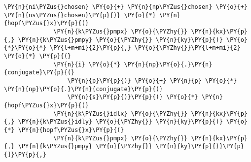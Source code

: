 \begin{Verbatim}[commandchars=\\\{\}]
              \PY{n}{ni\PYZus{}chosen} \PY{o}{+} \PY{n}{np\PYZus{}chosen} \PY{o}{+} \PY{n}{ns\PYZus{}chosen}\PY{p}{)} \PY{o}{*} \PY{n}{hopf\PYZus{}x}\PY{p}{(}
              \PY{n}{k\PYZus{}pmpx} \PY{o}{\PYZhy{}} \PY{n}{kx}\PY{p}{,} \PY{n}{k\PYZus{}pmpy} \PY{o}{\PYZhy{}} \PY{n}{ky}\PY{p}{)} \PY{o}{*}\PY{o}{*} \PY{l+m+mi}{2}\PY{p}{,} \PY{o}{\PYZhy{}}\PY{l+m+mi}{2} \PY{o}{*} \PY{p}{(}
              \PY{n}{i} \PY{o}{*} \PY{n}{np}\PY{o}{.}\PY{n}{conjugate}\PY{p}{(}
                  \PY{n}{p}\PY{p}{)} \PY{o}{+} \PY{n}{p} \PY{o}{*} \PY{n}{np}\PY{o}{.}\PY{n}{conjugate}\PY{p}{(}
                  \PY{n}{s}\PY{p}{)}\PY{p}{)} \PY{o}{*} \PY{n}{hopf\PYZus{}x}\PY{p}{(}
              \PY{n}{k\PYZus{}idlx} \PY{o}{\PYZhy{}} \PY{n}{kx}\PY{p}{,} \PY{n}{k\PYZus{}idly} \PY{o}{\PYZhy{}} \PY{n}{ky}\PY{p}{)} \PY{o}{*} \PY{n}{hopf\PYZus{}x}\PY{p}{(}
              \PY{n}{k\PYZus{}pmpx} \PY{o}{\PYZhy{}} \PY{n}{kx}\PY{p}{,} \PY{n}{k\PYZus{}pmpy} \PY{o}{\PYZhy{}} \PY{n}{ky}\PY{p}{)}\PY{p}{]}\PY{p}{,}

\end{Verbatim}
